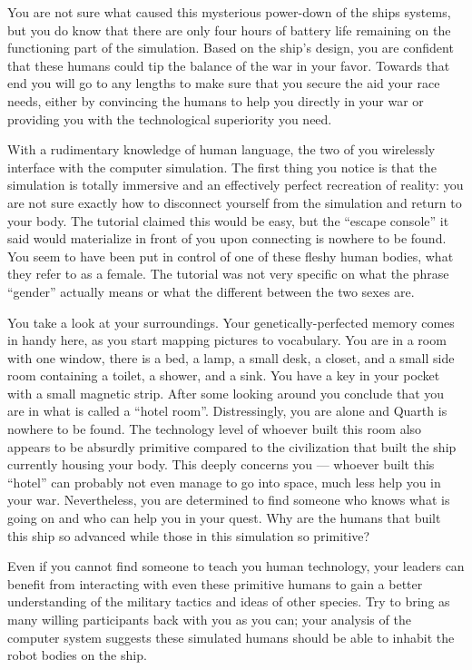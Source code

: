 \documentclass[char]{guildcamp1}
\begin{document}
You are not sure what caused this mysterious power-down of the ships systems, but you do know that there are only four hours of battery life remaining on the functioning part of the simulation.
Based on the ship's design, you are confident that these humans could tip the balance of the war in your favor. Towards that end you will go to any lengths to make sure that you secure the aid your race needs, either by convincing the humans to help you directly in your war or providing you with the technological superiority you need.

With a rudimentary knowledge of human language, the two of you wirelessly interface with the computer simulation. The first thing you notice is that the simulation is totally immersive and an effectively perfect recreation of reality: you are not sure exactly how to disconnect yourself from the simulation and return to your body. The tutorial claimed this would be easy, but the ``escape console'' it said would materialize in front of you upon connecting is nowhere to be found. You seem to have been put in control of one of these fleshy human bodies, what they refer to as a female. The tutorial was not very specific on what the phrase ``gender'' actually means or what the different between the two sexes are.

You take a look at your surroundings. Your genetically-perfected memory comes in handy here, as you start mapping pictures to vocabulary. You are in a room with one window, there is a bed, a lamp, a small desk, a closet, and a small side room containing a toilet, a shower, and a sink. You have a key in your pocket with a small magnetic strip. After some looking around you conclude that you are in what is called a ``hotel room''. Distressingly, you are alone and Quarth is nowhere to be found. The technology level of whoever built this room also appears to be absurdly primitive compared to the civilization that built the ship currently housing your body. This deeply concerns you --- whoever built this ``hotel'' can probably not even manage to go into space, much less help you in your war. Nevertheless, you are determined to find someone who knows what is going on and who can help you in your quest. Why are the humans that built this ship so advanced while those in this simulation so primitive?

Even if you cannot find someone to teach you human technology, your leaders can benefit from interacting with even these primitive humans to gain a better understanding of the military tactics and ideas of other species. Try to bring as many willing participants back with you as you can; your analysis of the computer system suggests these simulated humans should be able to inhabit the robot bodies on the ship.
\end{document}
